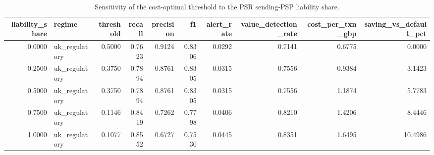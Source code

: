\begin{table}
\caption{Sensitivity of the cost-optimal threshold to the PSR sending-PSP liability share.}
\label{tab:table9_sensitivity_liability_share}
\begin{tabular}{rlrrrrrrrr}
\toprule
liability\_share & regime & threshold & recall & precision & f1 & alert\_rate & value\_detection\_rate & cost\_per\_txn\_gbp & saving\_vs\_default\_pct \\
\midrule
0.0000 & uk\_regulatory & 0.5000 & 0.7623 & 0.9124 & 0.8306 & 0.0292 & 0.7141 & 0.6775 & 0.0000 \\
0.2500 & uk\_regulatory & 0.3750 & 0.7894 & 0.8761 & 0.8305 & 0.0315 & 0.7556 & 0.9384 & 3.1423 \\
0.5000 & uk\_regulatory & 0.3750 & 0.7894 & 0.8761 & 0.8305 & 0.0315 & 0.7556 & 1.1874 & 5.7783 \\
0.7500 & uk\_regulatory & 0.1146 & 0.8419 & 0.7262 & 0.7798 & 0.0406 & 0.8210 & 1.4206 & 8.4446 \\
1.0000 & uk\_regulatory & 0.1077 & 0.8552 & 0.6727 & 0.7530 & 0.0445 & 0.8351 & 1.6495 & 10.4986 \\
\bottomrule
\end{tabular}
\end{table}
